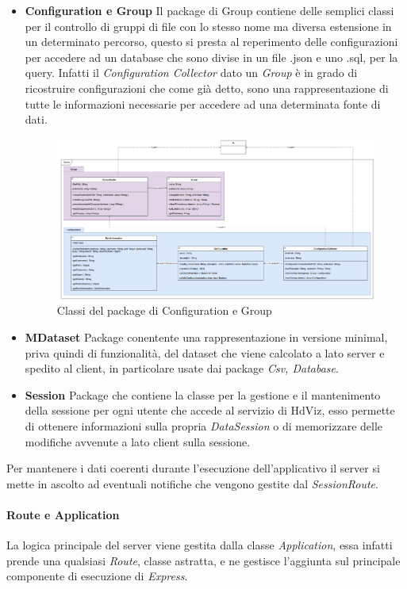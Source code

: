 \documentclass[../manuale_sviluppatore.tex]{subfiles}
\begin{document}
\begin{itemize}
	\item \textbf{Configuration e Group} Il package di Group contiene delle semplici classi per il controllo di gruppi
	di file con lo stesso nome ma diversa estensione in un determinato percorso, questo si presta al reperimento delle 
	configurazioni per accedere ad un database che sono divise in un file .json e uno .sql, per la query. 
	Infatti il \emph{Configuration Collector} dato un \emph{Group} è in grado di ricostruire configurazioni che 
	come già detto, sono una rappresentazione di tutte le informazioni necessarie per accedere ad una determinata fonte di dati.
	\begin{figure}[H]
		\centering
		\includegraphics[width=18cm]{img/server-group.png}
		\caption{Classi del package di Configuration e Group}
	\end{figure}

	\item \textbf{MDataset} Package conentente una rappresentazione in versione minimal, priva quindi di funzionalità, del dataset
	che viene calcolato a lato server e spedito al client, in particolare usate dai package \emph{Csv, Database}.

	\item \textbf{Session} Package che contiene la classe per la gestione e il mantenimento della sessione per ogni utente che 
	accede al servizio di HdViz, esso permette di ottenere informazioni sulla propria \emph{DataSession} o di  
	memorizzare delle modifiche avvenute a lato client sulla sessione.

\end{itemize}




Per mantenere i dati coerenti durante l'esecuzione dell'applicativo il server si mette in ascolto  
ad eventuali notifiche che vengono gestite dal \emph{SessionRoute}.

\paragraph{Route e Application} La logica principale del server viene gestita dalla classe \emph{Application},
essa infatti prende una qualsiasi \emph{Route}, classe astratta, e ne gestisce l'aggiunta sul principale
componente di esecuzione di \emph{Express}.
\end{document}

